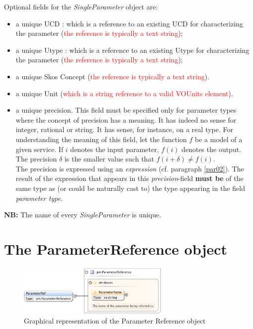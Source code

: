 \documentclass[a4paper,11pt] {ivoa}
\begin{document}
Optional fields for the {\it SingleParameter} object are:
\begin{itemize}
\item a unique UCD : which is a reference to an existing UCD for characterizing the parameter
(\textcolor{red}{the reference is typically a text string});
\item a unique Utype  : which is a reference to an existing Utype for characterizing the parameter
(\textcolor{red}{the reference is typically a text string});
\item a unique Skos Concept  (\textcolor{red}{the reference is typically a text string}).
\item a unique Unit (\textcolor{red}{which is a string reference to a valid VOUnits element}).
\item a unique precision. This field must be specified only for parameter types where the concept of
precision has a meaning. It has indeed no sense for integer, rational or string. It has
sense, for instance, on a real type. For understanding the meaning of this field, let the function
$f$ be a model of a given service. If $i$ denotes the input parameter, $f(i)$ denotes the output. The
precision $\delta$ is the smaller value such that $f(i+\delta) \neq f(i)$.\\ The precision is
expressed using an {\it expression} (cf. paragraph \ref{par02}). The result of the expression that
appears in this {\it precision}-field  {\bf must be} of the same type as (or could be naturally
cast to) the type appearing in the field {\it parameter type}.
\end{itemize}

{\bf NB:} The name of every {\it SingleParameter} is unique. 

\section{The ParameterReference object}\label{par-parRef}

\begin{figure}[htbp]
\begin{center}
\includegraphics[width=0.65\textwidth]{pictures/ParameterRef.jpg} 
\caption{Graphical representation of the Parameter Reference object}
\label{Pic-ParameterRef}
\end{center}
\end{figure}
\end{document}
